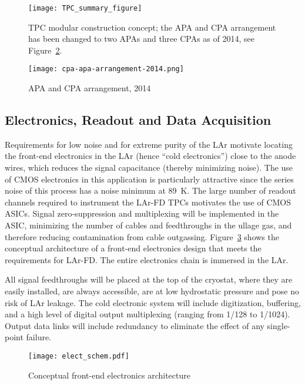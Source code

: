 \begin{figure}[htbp]
\centering
\texttt{[image: TPC\_summary\_figure]}
\caption{TPC modular construction concept; the APA and CPA arrangement has been changed to two APAs and three CPAs as of 2014, see Figure~\ref{fig:cpa-apa-arrangement-2014}.}
\label{fig:tpc-concept}
\end{figure}

\begin{figure}[htbp]
\centering
\texttt{[image: cpa-apa-arrangement-2014.png]}
\caption{APA and CPA arrangement, 2014}
\label{fig:cpa-apa-arrangement-2014}
\end{figure}


\subsection{Electronics, Readout and Data Acquisition}
\label{sec:det_electronics}

Requirements for low noise and for extreme purity of the LAr motivate locating
the front-end electronics in the LAr  (hence ``cold electronics'') close to the anode wires, which
reduces the signal capacitance (thereby minimizing noise).  The use of CMOS electronics in this application is particularly attractive since the series noise of this process has a noise minimum at 89~K. The large number of readout channels required to instrument
the LAr-FD TPCs motivates the use of CMOS ASICs.  
Signal zero-suppression and multiplexing will be implemented in the ASIC, minimizing the number of cables
and feedthroughs in the ullage gas, and therefore reducing contamination
from cable outgassing. Figure~\ref{fig:tpc-elec-schematic-1} shows the conceptual architecture of a front-end electronics design that meets the requirements for LAr-FD. The entire
electronics chain is immersed in the LAr.

All signal feedthroughs will be placed at the top of the cryostat, where they are easily installed, are always accessible, are at low hydrostatic pressure and pose no risk of LAr leakage.  The cold electronic system will include digitization, buffering, and a high level of digital output multiplexing (ranging from 1/128 to 1/1024). Output data links will include redundancy to eliminate the effect of any single-point failure. 

\begin{figure}[htbp]
\centering
\texttt{[image: elect\_schem.pdf]}
\caption{Conceptual front-end electronics architecture}
\label{fig:tpc-elec-schematic-1}
\end{figure}

